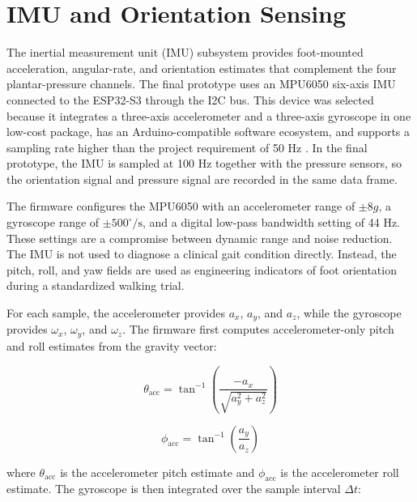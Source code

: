 
\section{IMU and Orientation Sensing}
\label{sec:imu_orientation}

The inertial measurement unit (IMU) subsystem provides foot-mounted acceleration, angular-rate, and orientation estimates that complement the four plantar-pressure channels. The final prototype uses an MPU6050 six-axis IMU connected to the ESP32-S3 through the I2C bus. This device was selected because it integrates a three-axis accelerometer and a three-axis gyroscope in one low-cost package, has an Arduino-compatible software ecosystem, and supports a sampling rate higher than the project requirement of 50 Hz \cite{invensense_mpu6050}. In the final prototype, the IMU is sampled at 100 Hz together with the pressure sensors, so the orientation signal and pressure signal are recorded in the same data frame.

The firmware configures the MPU6050 with an accelerometer range of $\pm 8g$, a gyroscope range of $\pm 500^\circ/\mathrm{s}$, and a digital low-pass bandwidth setting of 44 Hz. These settings are a compromise between dynamic range and noise reduction. The IMU is not used to diagnose a clinical gait condition directly. Instead, the pitch, roll, and yaw fields are used as engineering indicators of foot orientation during a standardized walking trial.

For each sample, the accelerometer provides $a_x$, $a_y$, and $a_z$, while the gyroscope provides $\omega_x$, $\omega_y$, and $\omega_z$. The firmware first computes accelerometer-only pitch and roll estimates from the gravity vector:

\begin{equation}
\theta_{\mathrm{acc}} =
\tan^{-1}\left(
\frac{-a_x}{\sqrt{a_y^2+a_z^2}}
\right)
\label{eq:acc_pitch}
\end{equation}

\begin{equation}
\phi_{\mathrm{acc}} =
\tan^{-1}\left(
\frac{a_y}{a_z}
\right)
\label{eq:acc_roll}
\end{equation}

where $\theta_{\mathrm{acc}}$ is the accelerometer pitch estimate and $\phi_{\mathrm{acc}}$ is the accelerometer roll estimate. The gyroscope is then integrated over the sample interval $\Delta t$:

